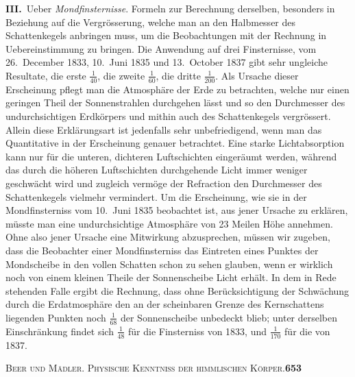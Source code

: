 \documentclass[12pt,a4paper]{article}
\begin{document}
\textbf{III.}\ Ueber \textit{Mondfinsternisse}. Formeln zur Berechnung derselben, besonders in Beziehung auf die Vergr\"osserung, welche man an den Halbmesser des Schattenkegels anbringen muss, um die Beobachtungen mit der Rechnung in Uebereinstimmung zu bringen. Die Anwendung auf drei Finsternisse, vom 26.\ December 1833, 10.\ Juni 1835 und 13.\ October 1837 gibt sehr ungleiche Resultate, die erste $\frac{1}{40}$, die zweite $\frac{1}{60}$, die dritte $\frac{1}{200}$. Als Ursache dieser Erscheinung pflegt man die Atmosph\"are der Erde zu betrachten, welche nur einen geringen Theil der Sonnenstrahlen durchgehen l\"asst und so den Durchmesser des undurchsichtigen Erdk\"orpers und mithin auch des Schattenkegels vergr\"ossert. Allein diese Erkl\"arungsart ist jedenfalls sehr unbefriedigend, wenn man das Quantitative in der Erscheinung genauer betrachtet. Eine starke Lichtabsorption kann nur f\"ur die unteren, dichteren Luftschichten einger\"aumt werden, w\"ahrend das durch die h\"oheren Luftschichten durchgehende Licht immer weniger geschw\"acht wird und zugleich verm\"oge der Refraction den Durchmesser des Schattenkegels vielmehr vermindert. Um die Erscheinung, wie sie in der Mondfinsterniss vom 10.\ Juni 1835 beobachtet ist, aus jener Ursache zu erkl\"aren, m\"usste man eine undurchsichtige Atmosph\"are von 23 Meilen H\"ohe annehmen. Ohne also jener Ursache eine Mitwirkung abzusprechen, m\"ussen wir zugeben, dass die Beobachter einer Mondfinsterniss das Eintreten eines Punktes der Mondscheibe in den vollen Schatten schon zu sehen glauben, wenn er wirklich noch von einem kleinen Theile der Sonnenscheibe Licht erh\"alt. In dem in Rede stehenden Falle ergibt die Rechnung, dass ohne Ber\"ucksichtigung der Schw\"achung durch die Erdatmosph\"are den an der scheinbaren Grenze des Kernschattens liegenden Punkten noch $\frac{1}{68}$ der Sonnenscheibe unbedeckt blieb; unter derselben Einschr\"ankung findet sich $\frac{1}{48}$ f\"ur die Finsterniss von 1833, und $\frac{1}{170}$ f\"ur die von 1837.

\begin{center}
\small\textsc{Beer und M\"adler. Physische Kenntniss der himmlischen K\"orper.}\quad\textbf{653}
\end{center}
\end{document}
